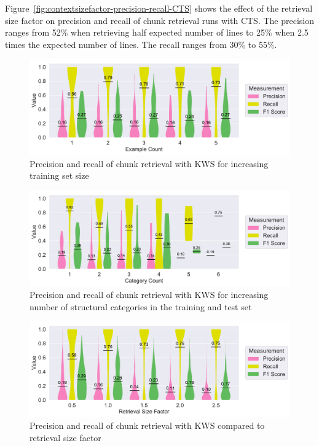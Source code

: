 \documentclass[\myrootdir/main.tex]{subfiles}
\begin{document}
Figure~\ref{fig:contextsizefactor-precision-recall-CTS} shows the effect of the retrieval size factor on precision and recall of chunk retrieval runs with CTS\@.
The precision ranges from 52\% when retrieving half expected number of lines to 25\% when 2.5 times the expected number of lines.
The recall ranges from 30\% to 55\%.

\begin{figure}[htbp]
		\centering
		\includegraphics[width=\textwidth, clip]{img/big-study/recall-precision-examplecount-KWS.pdf}
		\caption{Precision and recall of chunk retrieval with KWS for increasing training set size}
		\label{fig:recall-precision-examplecount-KWS}
\end{figure}

\begin{figure}[htbp]
		\centering
		\includegraphics[width=\textwidth, clip]{img/big-study/recall-precision-categorycount-KWS.pdf}
		\caption{Precision and recall of chunk retrieval with KWS for increasing number of structural categories in the training and test set}
		\label{fig:recall-precision-categorycount-KWS}
\end{figure}

\begin{figure}[htbp]
		\centering
		\includegraphics[width=\textwidth, clip]{img/big-study/contextsizefactor-precision-recall-KWS.pdf}
		\caption{Precision and recall of chunk retrieval with KWS compared to retrieval size factor}
		\label{fig:contextsizefactor-precision-recall-KWS}
\end{figure}
\end{document}
